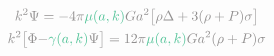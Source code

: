 \documentclass[preview]{standalone}
\begin{document}
\begin{gather}
\notag \textcolor{Gray}{k^2 \Psi = - 4 \pi}\textcolor{SeaGreen}{\mu(a,k)}\textcolor{Gray}{G a^2 \bigl[ \rho \Delta + 3 (\rho + P)\sigma \bigr]} \\
\notag \textcolor{Gray}{k^2 \bigl[ \Phi - } \textcolor{SeaGreen}{\gamma(a,k)} \textcolor{Gray}{ \Psi \bigr] = 12 \pi }\textcolor{SeaGreen}{\mu(a,k)}\textcolor{Gray}{G a^2 (\rho + P)\sigma}
\end{gather}
\end{document}
